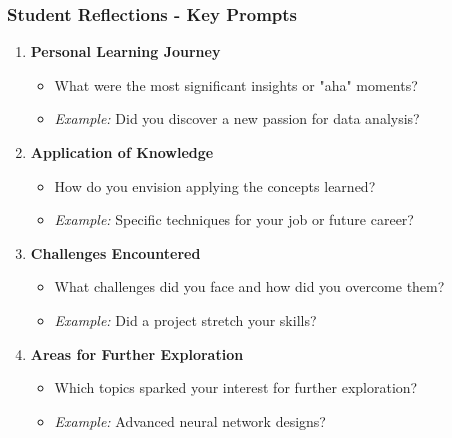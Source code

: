 \documentclass[aspectratio=169]{beamer}
\begin{document}
\begin{frame}[fragile]
    \frametitle{Student Reflections - Key Prompts}
    \begin{enumerate}
        \item \textbf{Personal Learning Journey}
        \begin{itemize}
            \item What were the most significant insights or "aha" moments?
            \item \textit{Example:} Did you discover a new passion for data analysis?
        \end{itemize}
        
        \item \textbf{Application of Knowledge}
        \begin{itemize}
            \item How do you envision applying the concepts learned?
            \item \textit{Example:} Specific techniques for your job or future career?
        \end{itemize}
        
        \item \textbf{Challenges Encountered}
        \begin{itemize}
            \item What challenges did you face and how did you overcome them?
            \item \textit{Example:} Did a project stretch your skills?
        \end{itemize}
        
        \item \textbf{Areas for Further Exploration}
        \begin{itemize}
            \item Which topics sparked your interest for further exploration?
            \item \textit{Example:} Advanced neural network designs?
        \end{itemize}
    \end{enumerate}
\end{frame}
\end{document}
